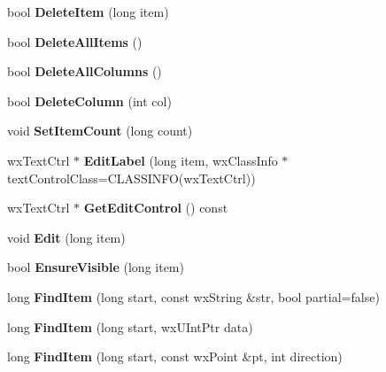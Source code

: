 \begin{DoxyCompactItemize}
\item 
bool {\bfseries DeleteItem} (long item)\label{classMuleExtern_1_1wxGenericListCtrl_a24d2c84faa23f7929b9f267e43a1dafe}

\item 
bool {\bfseries DeleteAllItems} ()\label{classMuleExtern_1_1wxGenericListCtrl_a149893091e21c55c9af09d140c833708}

\item 
bool {\bfseries DeleteAllColumns} ()\label{classMuleExtern_1_1wxGenericListCtrl_a689e9be30d81dc24475893a87af90177}

\item 
bool {\bfseries DeleteColumn} (int col)\label{classMuleExtern_1_1wxGenericListCtrl_a3ae55c65a4972ef84d3c0ee046ba5649}

\item 
void {\bfseries SetItemCount} (long count)\label{classMuleExtern_1_1wxGenericListCtrl_aa7aac49343a8db69d754903e4d95b095}

\item 
wxTextCtrl $\ast$ {\bfseries EditLabel} (long item, wxClassInfo $\ast$textControlClass=CLASSINFO(wxTextCtrl))\label{classMuleExtern_1_1wxGenericListCtrl_a8b913ccc433fc5e3ffe404aa037b0cbd}

\item 
wxTextCtrl $\ast$ {\bfseries GetEditControl} () const \label{classMuleExtern_1_1wxGenericListCtrl_ab5bd9348cd8f753f4783d10806c5159c}

\item 
void {\bfseries Edit} (long item)\label{classMuleExtern_1_1wxGenericListCtrl_aed634eafecf94e0d4dd051d2ef39af10}

\item 
bool {\bfseries EnsureVisible} (long item)\label{classMuleExtern_1_1wxGenericListCtrl_ae33c5dfd20811970515a5918c62cec80}

\item 
long {\bfseries FindItem} (long start, const wxString \&str, bool partial=false)\label{classMuleExtern_1_1wxGenericListCtrl_a706f3077007bfeb6f29d4b58eaab06f1}

\item 
long {\bfseries FindItem} (long start, wxUIntPtr data)\label{classMuleExtern_1_1wxGenericListCtrl_ae9b646c9dfc6e100bcc378371d37103f}

\item 
long {\bfseries FindItem} (long start, const wxPoint \&pt, int direction)\label{classMuleExtern_1_1wxGenericListCtrl_a2d97b0ffe842e3646cbc73d8ef58470b}


\end{DoxyCompactItemize}
